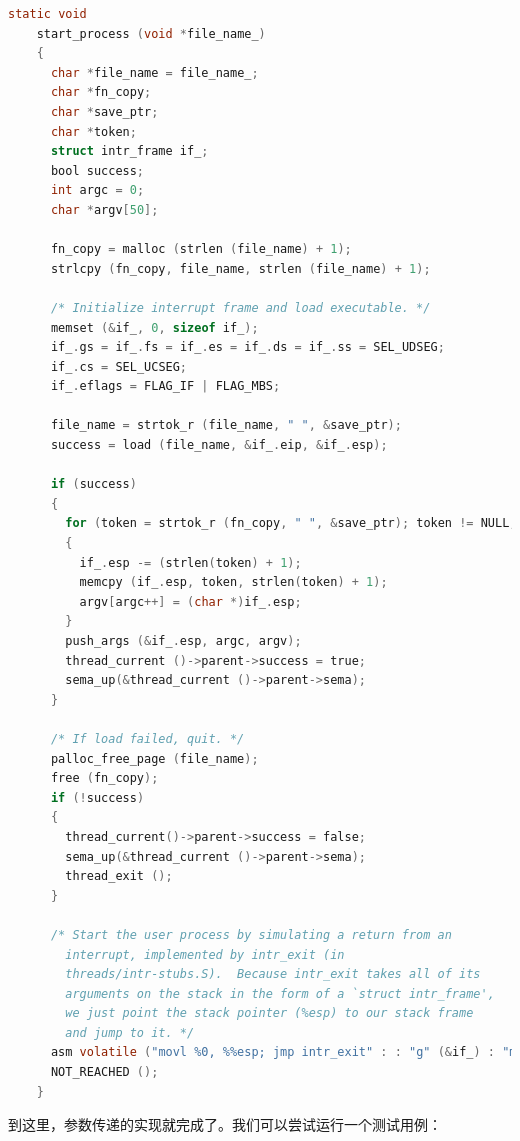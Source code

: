 \documentclass{article}
\begin{document}
\begin{lstlisting}[language=C, title=\texttt{src/userprog/process.c - start\_process()}]
    static void
    start_process (void *file_name_)
    {
      char *file_name = file_name_;
      char *fn_copy;
      char *save_ptr;
      char *token;
      struct intr_frame if_;
      bool success;
      int argc = 0;
      char *argv[50];
    
      fn_copy = malloc (strlen (file_name) + 1);
      strlcpy (fn_copy, file_name, strlen (file_name) + 1);
    
      /* Initialize interrupt frame and load executable. */
      memset (&if_, 0, sizeof if_);
      if_.gs = if_.fs = if_.es = if_.ds = if_.ss = SEL_UDSEG;
      if_.cs = SEL_UCSEG;
      if_.eflags = FLAG_IF | FLAG_MBS;
    
      file_name = strtok_r (file_name, " ", &save_ptr);
      success = load (file_name, &if_.eip, &if_.esp);
    
      if (success)
      {
        for (token = strtok_r (fn_copy, " ", &save_ptr); token != NULL; token = strtok_r (NULL, " ", &save_ptr))
        {
          if_.esp -= (strlen(token) + 1);
          memcpy (if_.esp, token, strlen(token) + 1);
          argv[argc++] = (char *)if_.esp;
        }
        push_args (&if_.esp, argc, argv);
        thread_current ()->parent->success = true;
        sema_up(&thread_current ()->parent->sema);
      }
    
      /* If load failed, quit. */
      palloc_free_page (file_name);
      free (fn_copy);
      if (!success)
      {
        thread_current()->parent->success = false;
        sema_up(&thread_current ()->parent->sema);
        thread_exit ();
      }
    
      /* Start the user process by simulating a return from an
        interrupt, implemented by intr_exit (in
        threads/intr-stubs.S).  Because intr_exit takes all of its
        arguments on the stack in the form of a `struct intr_frame',
        we just point the stack pointer (%esp) to our stack frame
        and jump to it. */
      asm volatile ("movl %0, %%esp; jmp intr_exit" : : "g" (&if_) : "memory");
      NOT_REACHED ();
    }

\end{lstlisting}

到这里，参数传递的实现就完成了。我们可以尝试运行一个测试用例：
\end{document}
